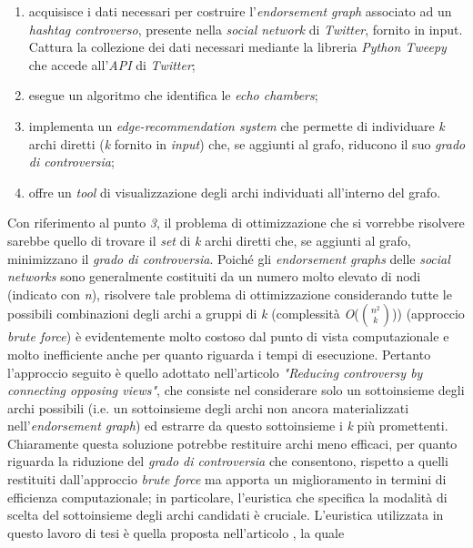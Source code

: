 \documentclass[trieste,12pt]{toptesi}
\begin{document}
\begin{enumerate}
\item acquisisce i dati necessari per costruire l'\textit{endorsement graph} associato ad un \textit{hashtag controverso}, presente nella \textit{social network} di \textit{Twitter}, fornito in input. Cattura la collezione dei dati necessari mediante la libreria \textit{Python Tweepy} che accede all'\textit{API} di \textit{Twitter};
\item esegue un algoritmo che identifica le \textit{echo chambers};
\item implementa un \textit{edge-recommendation system} che permette di individuare \textit{k} archi diretti (\textit{k} fornito in \textit{input}) che, se aggiunti al grafo, riducono il suo \textit{grado di controversia};
\item offre un \textit{tool} di visualizzazione degli archi individuati all'interno del grafo.
\end{enumerate}
Con riferimento al punto \textit{3}, il problema di ottimizzazione che si vorrebbe risolvere sarebbe quello di trovare il \textit{set} di \textit{k} archi diretti che, se aggiunti al grafo, minimizzano il \textit{grado di controversia}.
Poiché gli \textit{endorsement graphs} delle \textit{social networks} sono generalmente costituiti da un numero molto elevato di nodi (indicato con \textit{n}), risolvere tale problema di ottimizzazione considerando tutte le possibili combinazioni degli archi a gruppi di \textit{k} (complessità \textit{O}(${n^2\choose k}$)) (approccio \textit{brute force}) è evidentemente molto costoso dal punto di vista computazionale e molto inefficiente anche per quanto riguarda i tempi di esecuzione. Pertanto l'approccio seguito è quello adottato nell'articolo \textit{"Reducing controversy by connecting opposing views"}\cite{garimella:paper}, che consiste nel considerare solo un sottoinsieme degli archi possibili (i.e. un sottoinsieme degli archi non ancora materializzati nell'\textit{endorsement graph}) ed estrarre da questo sottoinsieme i \textit{k} più promettenti. Chiaramente questa soluzione potrebbe restituire archi meno efficaci, per quanto riguarda la riduzione del \textit{grado di controversia} che consentono, rispetto a quelli restituiti dall'approccio \textit{brute force} ma apporta un miglioramento in termini di efficienza computazionale; in particolare, l'euristica che specifica la modalità di scelta del sottoinsieme degli archi candidati è cruciale. L'euristica utilizzata in questo lavoro di tesi è quella proposta nell'articolo \cite{garimella:paper}, la quale
\end{document}

